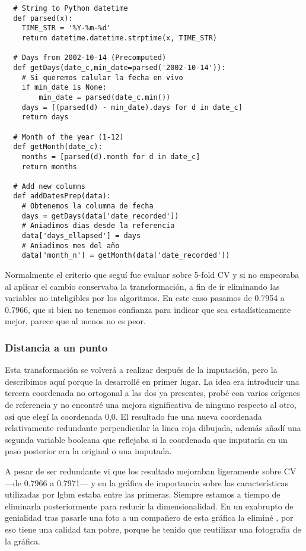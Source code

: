 \documentclass{article}
\newcommand{\img}[2]{
\noindent\makebox[\textwidth][c]{\texttt{[image: imgs/\#1]}}%
}
\begin{document}
\begin{verbatim}
  # String to Python datetime
  def parsed(x):
    TIME_STR = '%Y-%m-%d'
    return datetime.datetime.strptime(x, TIME_STR)

  # Days from 2002-10-14 (Precomputed)
  def getDays(date_c,min_date=parsed('2002-10-14')):
    # Si queremos calular la fecha en vivo
    if min_date is None:
        min_date = parsed(date_c.min())
    days = [(parsed(d) - min_date).days for d in date_c]
    return days
   
  # Month of the year (1-12)
  def getMonth(date_c):
    months = [parsed(d).month for d in date_c]
    return months
  
  # Add new columns
  def addDatesPrep(data):
    # Obtenemos la columna de fecha
    days = getDays(data['date_recorded'])
    # Aniadimos dias desde la referencia
    data['days_ellapsed'] = days
    # Aniadimos mes del año
    data['month_n'] = getMonth(data['date_recorded'])
\end{verbatim}

Normalmente el criterio que seguí fue evaluar sobre 5-fold CV y si no empeoraba al aplicar el cambio conservaba la transformación, a fin de ir eliminando las variables no inteligibles por los algoritmos. En este caso pasamos de 0.7954 a 0.7966, que si bien no tenemos confianza para indicar que sea estadísticamente mejor, parece que al menos no es peor.

\subsubsection{Distancia a un punto}

Esta transformación se volverá a realizar después de la imputación, pero la describimos aquí porque la desarrollé en primer lugar. La idea era introducir una tercera coordenada no ortogonal a las dos ya presentes, probé con varios orígenes de referencia y no encontré una mejora significativa de ninguno respecto al otro, así que elegí la coordenada 0,0. El resultado fue una nueva coordenada relativamente redundante perpendicular la linea roja dibujada, además añadí una segunda variable booleana que reflejaba si la coordenada que imputaría en un paso posterior era la original o una imputada.

\img{nan_map2}{0.5}

A pesar de ser redundante vi que los resultado mejoraban ligeramente sobre CV ---de 0.7966 a 0.7971--- y en la gráfica de importancia sobre las características utilizadas por lgbm estaba entre las primeras. Siempre estamos a tiempo de eliminarla posteriormente para reducir la dimensionalidad. En un exabrupto de genialidad tras pasarle una foto a un compañero de esta gráfica la eliminé , por eso tiene una calidad tan pobre, porque he tenido que reutilizar una fotografía de la gráfica.
\end{document}
